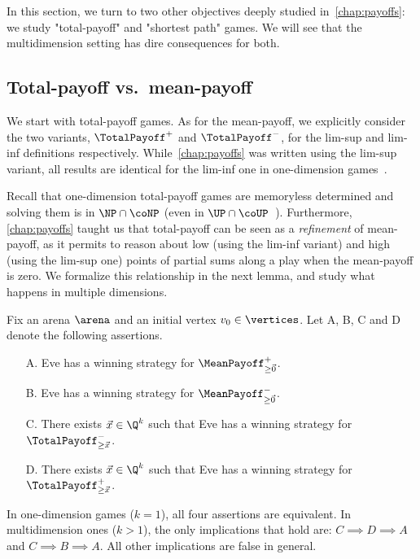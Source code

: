 In this section, we turn to two other objectives deeply studied in~\cref{chap:payoffs}: we study "total-payoff" and "shortest path" games. We will see that the multidimension setting has dire consequences for both.

\subsection{Total-payoff vs.~mean-payoff}

We start with total-payoff games. As for the mean-payoff, we explicitly consider the two variants, $\TotalPayoff^+$ and $\TotalPayoff^-$, for the lim-sup and lim-inf definitions respectively. While~\cref{chap:payoffs} was written using the lim-sup variant, all results are identical for the lim-inf one in one-dimension games~\cite{Gawlitza&Seidl:2009}.

Recall that one-dimension total-payoff games are memoryless determined and solving them is in $\NP \cap \coNP$ (even in $\UP \cap \coUP$~\cite{Gawlitza&Seidl:2009}). Furthermore, \cref{chap:payoffs} taught us that total-payoff can be seen as a \textit{refinement} of mean-payoff, as it permits to reason about low (using the lim-inf variant) and high (using the lim-sup one) points of partial sums along a play when the mean-payoff is zero. We formalize this relationship in the next lemma, and study what happens in multiple dimensions. 

\begin{lemma}
\label{12-lem:MPTP}
Fix an arena $\arena$ and an initial vertex $v_0 \in \vertices$. Let A, B, C and D denote the following assertions.
\begin{enumerate}
\item[A.] Eve has a winning strategy for $\MeanPayoff^{+}_{\geq \vec{0}}$.
\item[B.] Eve has a winning strategy for $\MeanPayoff^{-}_{\geq \vec{0}}$.
\item[C.] There exists $\vec{x} \in \Q^{k}$ such that Eve has a winning strategy for $\TotalPayoff^{-}_{\geq \vec{x}}$.
\item[D.] There exists $\vec{x} \in \Q^{k}$ such that Eve has a winning strategy for $\TotalPayoff^{+}_{\geq \vec{x}}$.
\end{enumerate}
In one-dimension games ($k = 1$), all four assertions are equivalent. In multidimension ones ($k > 1$), the only implications that hold are: $C \implies D \implies A$ and $C \implies B \implies A$. All other implications are false in general.
\end{lemma}

